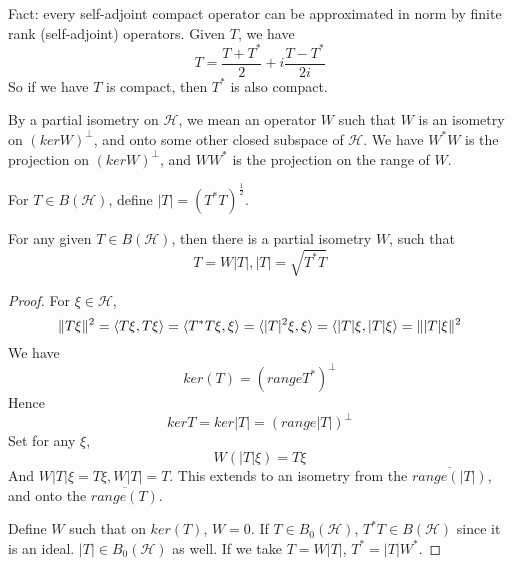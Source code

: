 Fact: every self-adjoint compact operator can be approximated in norm by finite rank (self-adjoint) operators. Given $T$, we have 
\begin{equation*}
    T=\frac{T+T^*}{2}+i\frac{T-T^*}{2i}
\end{equation*}
So if we have $T$ is compact, then $T^*$ is also compact.

\begin{definition}
    By a partial isometry on $\mathcal{H}$, we mean an operator $W$ such that $W$ is an isometry on $(ker W)^\perp$, and onto some other closed subspace of $\mathcal{H}$. We have $W^*W$ is the projection on $(ker W)^\perp$, and $WW^*$ is the projection on the range of $W$.
\end{definition}
For $T\in B(\mathcal{H})$, define $|T|=(T^*T)^\frac{1}{2}$. 
\begin{theorem}
    For any given $T\in B(\mathcal{H})$, then there is a partial isometry $W$, such that
    \begin{equation*}
        T=W|T|, |T|=\sqrt{T^*T}
    \end{equation*}
\end{theorem}
\begin{proof}
    For $\xi\in\mathcal{H}$, 
    \begin{equation*}
        \|T\xi\|^2=\langle T\xi, T\xi\rangle=\langle T^*T\xi, \xi\rangle=\langle |T|^2\xi, \xi\rangle=\langle |T|\xi, |T|\xi\rangle=\||T|\xi\|^2
    \end{equation*}
    We have 
    \begin{equation*}
        ker(T)=(range T^*)^\perp
    \end{equation*}
    Hence 
    \begin{equation*}
        ker T=ker|T|=(range|T|)^\perp
    \end{equation*}
    Set for any $\xi$, 
    \begin{equation*}
        W(|T|\xi)=T\xi
    \end{equation*}
    And $W|T|\xi=T\xi, W|T|=T$. This extends to an isometry from the $\overline{range(|T|)}$, and onto the $\overline{range(T)}$.

    Define $W$ such that on $ker(T)$, $W=0$. If $T\in B_0(\mathcal{H})$, $T^*T\in B(\mathcal{H})$ since it is an ideal. $|T|\in B_0(\mathcal{H})$ as well. If we take $T=W|T|$, $T^*=|T|W^*$. 
\end{proof}

